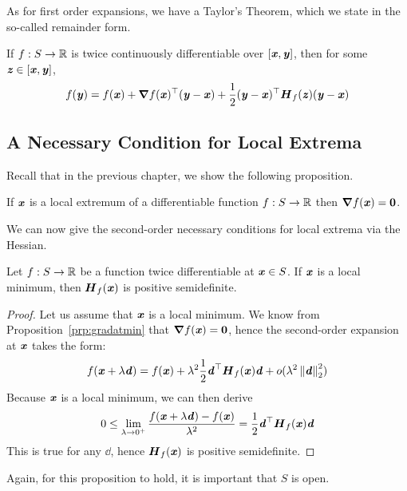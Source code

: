As for first order expansions, we have a Taylor's Theorem, which we
state in the so-called remainder form.
\begin{theorem}
  \label{thm:taylorremainder2}
  If $f:S\to \R$ is twice continuously differentiable over $[\xx, \yy]$, then for
  some $\zz \in [\xx, \yy]$,
\begin{displaymath}
  f(\yy) = f(\xx) + \grad f(\xx)^\trp (\yy-\xx)
  + \frac{1}{2}(\yy-\xx)^\trp  \HH_f(\zz) (\yy-\xx)
\end{displaymath}
\end{theorem}

\subsection{A Necessary Condition for Local Extrema}

Recall that in the previous chapter, we show the following proposition.
\begin{proposition}
\label{prp:gradatmin}
    If $\xx$ is a local extremum of a differentiable function
    $f:S\rightarrow \R$
    then $\grad f(\xx) = \veczero$.
\end{proposition}

We can now give the second-order necessary conditions for local extrema via the Hessian.
\begin{theorem}
Let $f:S \rightarrow\R$ be a function twice differentiable at
    $\xx\in S$.
    If $\xx$ is a local minimum, then $\HH_f(\xx)$ is positive
    semidefinite.
\end{theorem}
\begin{proof}
  Let us assume that $\xx$ is a local minimum. We know from
    Proposition~\ref{prp:gradatmin} that $\grad f(\xx)= \veczero$, hence the second-order expansion at $\xx$ takes the form:
    \begin{displaymath}
        f(\xx + \lambda\dd) = f(\xx) + \lambda^2 \frac{1}{2} \dd^\trp
        \HH_f(\xx)\dd + o(\lambda^2 \norm{\dd}_2^2)
    \end{displaymath}
    Because $\xx$ is a local minimum,
    we can then derive
\begin{displaymath}
  0 \leq\lim_{\lambda \to 0^+}
  \frac{f(\xx+\lambda\dd)-f(\xx)}{\lambda^2} = \frac{1}{2}\dd^\trp \HH_f(\xx)\dd
\end{displaymath}
This is true for any $\dd$, hence $\HH_f(\xx)$ is positive semidefinite.
\end{proof}
  \begin{remark}
    Again, for this proposition to hold, it is important that $S$ is
    open.
  \end{remark}

